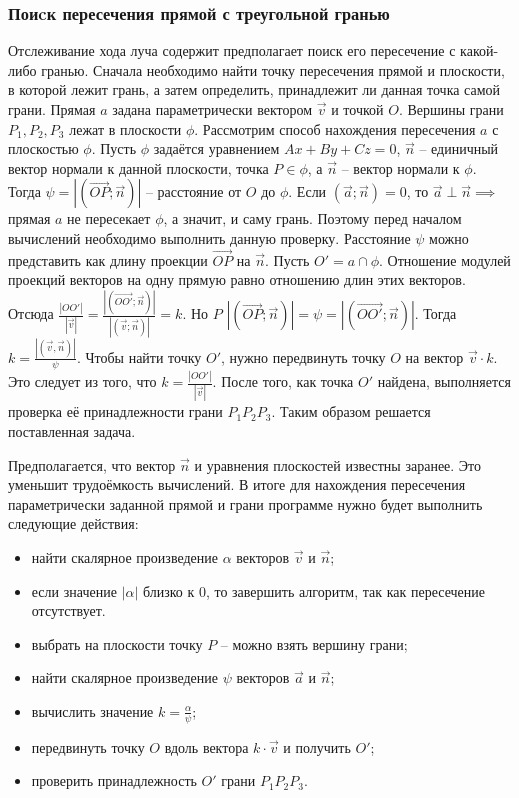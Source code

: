 {    \subsubsection{Поиcк пересечения прямой с треугольной гранью} {
        Отслеживание хода луча содержит предполагает поиск
        его пересечение с какой-либо гранью.
        Сначала необходимо найти точку пересечения прямой и плоскости,
        в которой лежит грань, а затем определить,
        принадлежит ли данная точка самой грани.
        Прямая $a$ задана параметрически вектором $\vec{v}$ и точкой $O$.
        Вершины грани $P_1, P_2, P_3$ лежат в плоскости $\phi$.
        Рассмотрим способ нахождения пересечения $a$ с плоскостью $\phi$.
        Пусть $\phi$ задаётся уравнением $Ax + By + Cz = 0$,
        $\vec{n}$ -- единичный вектор нормали к данной плоскости,
        точка $P \in \phi$, а $\vec{n}$ -- вектор нормали к $\phi$.
        Тогда $\psi = |(\vec{OP}; \vec{n})|$ -- расстояние от $O$ до $\phi$.
        Если $(\vec{a}; \vec{n}) = 0$, то $\vec{a} \perp \vec{n} \implies$
        прямая $a$ не пересекает $\phi$, а значит, и саму грань.
        Поэтому перед началом вычислений необходимо выполнить данную проверку.
        Расстояние $\psi$ можно представить как длину проекции
        $\vec{OP}$ на $\vec{n}$.
        Пусть $O' = a \cap \phi$.
        Отношение модулей проекций векторов на одну прямую равно
        отношению длин этих векторов.
        Отсюда $\frac{|OO'|}{|\vec{v}|}=
        \frac{|(\vec{OO'};\vec{n})|}{|(\vec{v};\vec{n})|} = k$.
        Но $P$ $|(\vec{OP}; \vec{n})| = \psi = |(\vec{OO'}; \vec{n})|$.
        Тогда $k = \frac{|(\vec{v}, \vec{n})|}{\psi}$.
        Чтобы найти точку $O'$, нужно передвинуть точку $O$ на вектор $\vec{v} \cdot k$.
        Это следует из того, что $k = \frac{|OO'|}{|\vec{v}|}$.
        После того, как точка $O'$ найдена, выполняется проверка
        её принадлежности грани $P_1P_2P_3$.
        Таким образом решается поставленная задача.

        Предполагается, что вектор $\vec{n}$ и уравнения плоскостей известны заранее.
        Это уменьшит трудоёмкость вычислений.
        В итоге для нахождения пересечения параметрически заданной прямой и
        грани программе нужно будет выполнить следующие действия:
        \begin{itemize}
            \item найти скалярное произведение $\alpha$ векторов $\vec{v}$ и $\vec{n}$;
            \item если значение $|\alpha|$ близко к 0, то завершить алгоритм, так как пересечение отсутствует.
            \item выбрать на плоскости точку $P$ -- можно взять вершину грани;
            \item найти скалярное произведение $\psi$ векторов $\vec{a}$ и $\vec{n}$;
            \item вычислить значение $k = \frac{\alpha}{\psi}$;
            \item передвинуть точку $O$ вдоль вектора $k \cdot \vec{v}$ и получить $O'$;
            \item проверить принадлежность $O'$ грани $P_1P_2P_3$.
        \end{itemize}
    }
}
